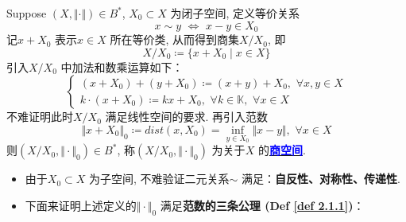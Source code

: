 	\begin{defn}\label{def 2.4.1}
		Suppose $(X , \Vert \cdot \Vert) \in B^*$, $X_0 \subset X$ 为闭子空间, 定义等价关系
		\[ x \sim y \,\, \Leftrightarrow \,\, x - y \in X_0 \]
		记$x + X_0$ 表示$x \in X$ 所在等价类, 从而得到商集$X / X_0$, 即
		\[ X / X_0 \coloneqq \{ x + X_0 \mid x \in X \} \]
		引入$X / X_0$ 中加法和数乘运算如下：
		\[ 
		 \begin{cases}
		 	(x + X_0) + (y + X_0) \coloneqq (x + y) + X_0 , \,\, \forall x , y \in X \\
		 	k \cdot (x + X_0) \coloneqq kx + X_0 , \,\, \forall k \in \mathbb{K} , \,\, \forall x \in X
		 \end{cases}
		 \]
		 不难证明此时$X / X_0$ 满足线性空间的要求. 再引入范数
		 \[ \Vert x + X_0 \Vert_0 \coloneqq dist(x , X_0) = \inf_{y \in X_0} \Vert x - y \Vert , \,\, \forall x \in X \]
		 则$(X / X_0 , \Vert \cdot \Vert_0) \in B^*$, 称$(X / X_0 , \Vert \cdot \Vert_0)$ 为关于$X$ 的\underline{\textcolor{blue}{\textbf{商空间}}}. 
		 
		 \vspace{4em}
		 
		 \begin{rmk}
		 	\begin{itemize}
		 		\item 由于$X_0 \subset X$ 为子空间, 不难验证二元关系$\sim$ 满足：\textbf{自反性、对称性、传递性}. 
		 		
		 		\vspace{4em}
		 		
		 		\item 下面来证明上述定义的$\Vert \cdot \Vert_0$ 满足\textbf{范数的三条公理 (Def \ref{def 2.1.1})}：
		 		
		 		\vspace{4em}
		 		

\end{itemize}
\end{rmk}
\end{defn}
